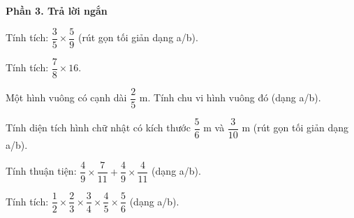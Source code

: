 \textbf{Phần 3. Trả lời ngắn}

\begin{ex} %
Tính tích: $\dfrac{3}{5} \times \dfrac{5}{9}$ (rút gọn tối giản dạng a/b).
\end{ex}

\begin{ex} %
Tính tích: $\dfrac{7}{8} \times 16$.
\end{ex}

\begin{ex} %
Một hình vuông có cạnh dài $\dfrac{2}{5}\text{ m}$. Tính chu vi hình vuông đó (dạng a/b).
\end{ex}

\begin{ex} %
Tính diện tích hình chữ nhật có kích thước $\dfrac{5}{6}\text{ m}$ và $\dfrac{3}{10}\text{ m}$ (rút gọn tối giản dạng a/b).
\end{ex}

\begin{ex} %
Tính thuận tiện: $\dfrac{4}{9} \times \dfrac{7}{11} + \dfrac{4}{9} \times \dfrac{4}{11}$ (dạng a/b).
\end{ex}

\begin{ex} %
Tính tích: $\dfrac{1}{2} \times \dfrac{2}{3} \times \dfrac{3}{4} \times \dfrac{4}{5} \times \dfrac{5}{6}$ (dạng a/b).
\end{ex}
